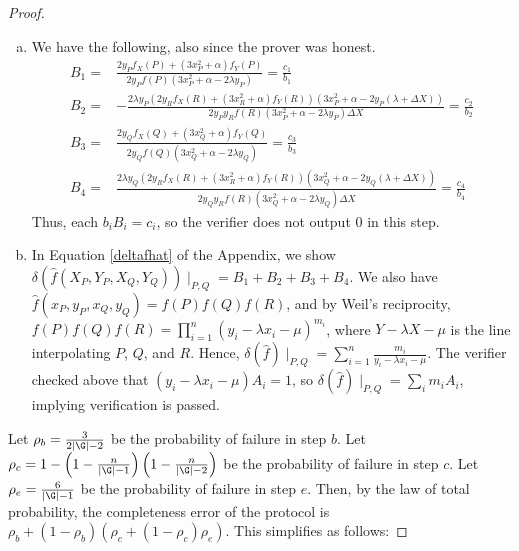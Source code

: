\documentclass[11pt,letterpaper]{article}
\theoremstyle{definition}
\newcommand{\6}{\mathbf}
\newcommand{\7}{\mathcal}
\begin{document}
\begin{proof}
\begin{enumerate}[(a)]
\item We have the following, also since the prover was honest.
\begin{align}
B_1 =& \frac{2y_P f_X(P) + (3x_P^2+\alpha)f_Y(P)}{2y_Pf(P)(3x_P^2+\alpha-2\lambda y_P)} = \frac{c_1}{b_1}\\
B_2 =& - \frac{2\lambda y_P(2y_Rf_X(R) + (3x_R^2+\alpha) f_Y(R))(3x_P^2+\alpha - 2y_P(\lambda + \Delta X))}{2y_Py_Rf(R)(3x_P^2+\alpha-2\lambda y_P)\Delta X} = \frac{c_2}{b_2} \\
B_3 =& \frac{2y_Qf_X(Q) + (3x_Q^2+\alpha) f_Y(Q)}{2y_Qf(Q)(3x_Q^2+\alpha - 2\lambda y_Q)} = \frac{c_3}{b_3} \\
B_4 =& \frac{2\lambda y_Q(2y_Rf_X(R) + (3x_R^2+\alpha)f_Y(R))(3x_Q^2+\alpha - 2y_Q(\lambda + \Delta X))}{2y_Qy_Rf(R)(3x_Q^2+\alpha  - 2\lambda y_Q) \Delta X} = \frac{c_4}{b_4}
\end{align}
Thus, each $b_i B_i = c_i$, so the verifier does not output $0$ in this step.

\item In Equation \ref{deltafhat} of the Appendix, we show $\delta(\widehat{f}(X_P,Y_P,X_Q,Y_Q))\mid_{P,Q} = B_1 + B_2 + B_3 + B_4$.   We also have $\widehat{f}(x_P,y_P,x_Q,y_Q) = f(P)f(Q)f(R)$, and by Weil's reciprocity, $f(P)f(Q)f(R) = \prod_{i=1}^{n} (y_i - \lambda x_i - \mu)^{m_i}$, where $Y - \lambda X - \mu$ is the line interpolating $P$, $Q$, and $R$. Hence, $\delta(\widehat{f})\mid_{P,Q} = \sum_{i=1}^{n} \frac{m_i}{y_i-\lambda x_i - \mu}$. The verifier checked above that $(y_i-\lambda x_i - \mu)A_i = 1$, so $\delta(\widehat{f})\mid_{P,Q} = \sum_i m_i A_i$, implying verification is passed.
\end{enumerate}

Let $\rho_b = \frac{3}{2\left|\G\right| - 2}$ be the probability of failure in step $b$. Let $\rho_c = 1 - \left(1-\frac{n}{\left|\G\right|-1}\right)\left(1-\frac{n}{\left|\G\right|-2}\right)$ be the probability of failure in step $c$. Let $\rho_e = \frac{6}{\left|\G\right|-1}$ be the probability of failure in step $e$.
Then, by the law of total probability, the completeness error of the protocol is $\rho_b + (1-\rho_b)(\rho_c + (1-\rho_c)\rho_e)$. This simplifies
as follows: 




\end{proof}
\end{document}
